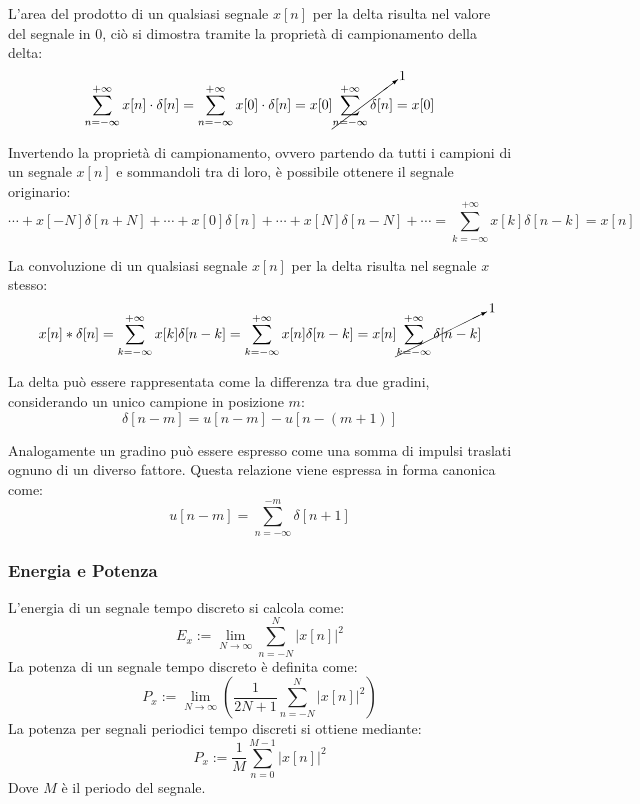 \documentclass{article}
\numberwithin{equation}{subsection}
\begin{document}
L'area del prodotto di un qualsiasi segnale $x[n]$ per la delta risulta nel valore del segnale in $0$, ciò si dimostra tramite la proprietà di campionamento della delta:
\begin{equation*}
    \displaystyle\sum_{n=-\infty}^{+\infty} x[n]\cdot\delta[n]=\sum_{n=-\infty}^{+\infty} x[0]\cdot\delta[n]=x[0]\cancelto{1}{\sum_{n=-\infty}^{+\infty}\delta[n]}=x[0]
\end{equation*}


Invertendo la proprietà di campionamento, ovvero partendo da tutti i campioni di un segnale $x[n]$ e sommandoli tra di loro, è possibile ottenere il segnale originario: 
\begin{equation*}
    \cdots+x[-N]\delta[n+N]+\cdots+x[0]\delta[n]+\cdots+x[N]\delta[n-N]+\cdots=\displaystyle\sum_{k=-\infty}^{+\infty} x[k]\delta[n-k]=x[n]
\end{equation*}


La convoluzione di un qualsiasi segnale $x[n]$ per la delta risulta nel segnale $x$ stesso:
\begin{equation}
    x[n]*\delta[n]=\displaystyle\sum_{k=-\infty}^{+\infty}x[k]\delta[n-k]=\sum_{k=-\infty}^{+\infty}x[n]\delta[n-k]=x[n]\cancelto{1}{\sum_{k=-\infty}^{+\infty}\delta[n-k]}
\end{equation}


La delta può essere rappresentata come la differenza tra due gradini, considerando un unico campione in posizione $m$:
\begin{equation*}
    \delta[n-m]=u[n-m]-u[n-(m+1)]
\end{equation*}


Analogamente un gradino può essere espresso come una somma di impulsi traslati ognuno di un diverso fattore. Questa relazione viene espressa in forma canonica come:
\begin{equation*}
    u[n-m]=\displaystyle\sum_{n=-\infty}^{-m}\delta[n+1]
\end{equation*}

\subsubsection{Energia e Potenza}

L'energia di un segnale tempo discreto si calcola come:
\begin{equation}
    E_x:=\displaystyle\lim_{N\to\infty}\sum_{n=-N}^N|x[n]|^2
\end{equation}
La potenza di un segnale tempo discreto è definita come:
\begin{equation}
    P_x:=\displaystyle\lim_{N\to\infty}\left(\frac{1}{2N+1}\sum_{n=-N}^N|x[n]|^2\right)
\end{equation}
La potenza per segnali periodici tempo discreti si ottiene mediante:
\begin{equation}
    P_x:=\displaystyle\frac{1}{M}\sum_{n=0}^{M-1}|x[n]|^2
\end{equation}
Dove $M$ è il periodo del segnale.
\end{document}
